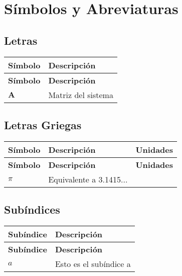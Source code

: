 \chapter*{Símbolos y Abreviaturas}
\section*{Letras}
\begin{longtable}{>{\raggedright\arraybackslash}m{}>{\raggedright\arraybackslash}m{}}
	\textbf{Símbolo} & \textbf{Descripción} \\[0.5ex] \hline%
	\endfirsthead%
	\textbf{Símbolo} & \textbf{Descripción} \\[0.5ex] \hline%
	\endhead%
	$\mathbf{A}$ & Matriz del sistema\\
\end{longtable}

\section*{Letras Griegas}
\begin{longtable}{>{\raggedright\arraybackslash}m{}>{\raggedright\arraybackslash}m{}>{\centering\arraybackslash}m{}}
	\textbf{Símbolo} & \textbf{Descripción} & \textbf{Unidades} \\[0.5ex] \hline%
	\endfirsthead%
	\textbf{Símbolo} & \textbf{Descripción} & \textbf{Unidades} \\[0.5ex] \hline%
	\endhead%
	$\pi$ & Equivalente a 3.1415... & \\
\end{longtable}

\section*{Subíndices}
\begin{longtable}{>{\raggedright\arraybackslash}m{}>{\raggedright\arraybackslash}m{}}
	\textbf{Subíndice} & \textbf{Descripción} \\[0.5ex] \hline%
	\endfirsthead%
	\textbf{Subíndice} & \textbf{Descripción} \\[0.5ex] \hline%
	\endhead%
	$a$ & Esto es el subíndice a\\
\end{longtable}

